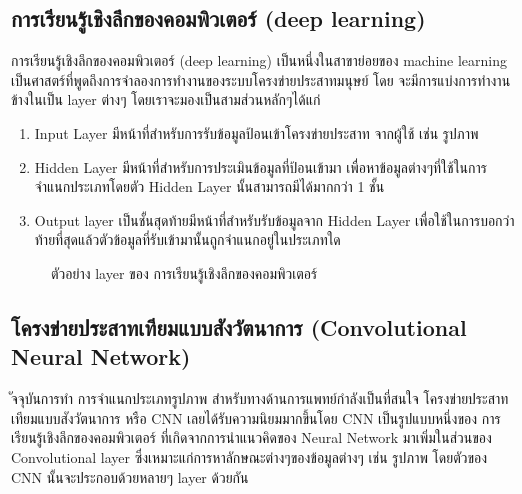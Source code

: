 \documentclass[12pt,oneside,openright,a4paper]{cpe-thai-project}
\begin{document}
\subsection{การเรียนรู้เชิงลึกของคอมพิวเตอร์ (deep learning)}

\par การเรียนรู้เชิงลึกของคอมพิวเตอร์ (deep learning) เป็นหนึ่งในสาขาย่อยของ machine learning เป็นศาสตร์ที่พูดถึงการจำลองการทำงานของระบบโครงข่ายประสาทมนุษย์ โดย จะมีการแบ่งการทำงานข้างในเป็น layer ต่างๆ โดยเราจะมองเป็นสามส่วนหลักๆได้แก่ 	

\begin{enumerate}
  \item Input Layer มีหน้าที่สำหรับการรับข้อมูลป้อนเข้าโครงข่ายประสาท จากผู้ใช้ เช่น รูปภาพ
  \item Hidden Layer มีหน้าที่สำหรับการประเมินข้อมูลที่ป้อนเข้ามา เพื่อหาข้อมูลต่างๆที่ใช้ในการจำแนกประเภทโดยตัว Hidden Layer นั้นสามารถมีได้มากกว่า 1 ชั้น
  \item Output layer เป็นชั้นสุดท้ายมีหน้าที่สำหรับรับข้อมูลจาก Hidden Layer เพื่อใช้ในการบอกว่าท้ายที่สุดแล้วตัวข้อมูลที่รับเข้ามานั้นถูกจำแนกอยู่ในประเภทใด
\end{enumerate}

\begin{figure}[!ht]\centering
  \setlength{\fboxrule}{0.2mm} %
  \setlength{\fboxsep}{1cm}
  \caption{ตัวอย่าง layer ของ การเรียนรู้เชิงลึกของคอมพิวเตอร์}\label{fig:deep}
\end{figure}

\subsection{โครงข่ายประสาทเทียมแบบสังวัตนาการ (Convolutional Neural Network)\cite{CS231}} 
ัจจุบันการทำ การจำแนกประเภทรูปภาพ สำหรับทางด้านการแพทย์กำลังเป็นที่สนใจ โครงข่ายประสาทเทียมแบบสังวัตนาการ 
หรือ CNN เลยได้รับความนิยมมากขึ้นโดย CNN เป็นรูปแบบหนึ่งของ การเรียนรู้เชิงลึกของคอมพิวเตอร์ ที่เกิดจากการนำแนวคิดของ  
Neural Network มาเพิ่มในส่วนของ Convolutional layer ซึ่งเหมาะแก่การหาลักษณะต่างๆของข้อมูลต่างๆ เช่น รูปภาพ 
โดยตัวของ CNN นั้นจะประกอบด้วยหลายๆ layer ด้วยกัน
\end{document}
